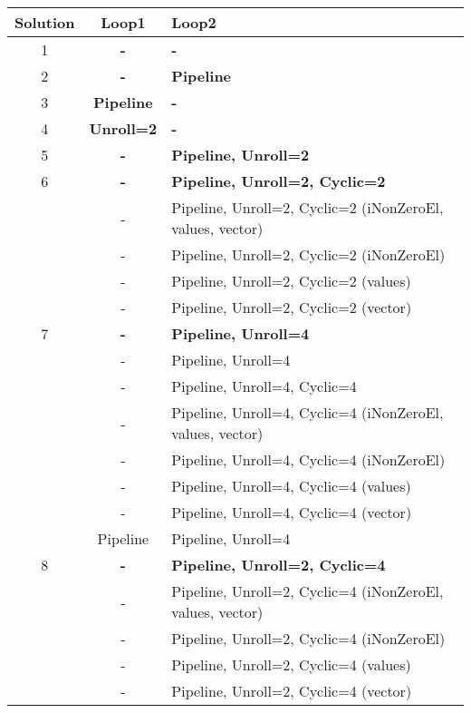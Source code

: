 \begin{table}[H]
	\centering
	\begin{tabular}{|c|c|l|}
		\hline
		\textbf{Solution} & Loop1 & Loop2 \\
		\hline
		
		1 & \textbf{-} & \textbf{-} \\
		\hline
		
		2 & \textbf{-} & \textbf{Pipeline} \\
		\hline
		
		3 & \textbf{Pipeline} & \textbf{-} \\
		\hline
		
		4 & \textbf{Unroll=2} & \textbf{-} \\
		\hline
		
		5 & \textbf{-} & \textbf{Pipeline, Unroll=2} \\
		\hline
		
		 6 & \textbf{-} & \textbf{Pipeline, Unroll=2, Cyclic=2} \\
		 & - & \tabitem\footnotesize{Pipeline, Unroll=2, Cyclic=2 (iNonZeroEl, values, vector)} \\
		 & - & \tabitem\footnotesize{Pipeline, Unroll=2, Cyclic=2 (iNonZeroEl)} \\
		 & - & \tabitem\footnotesize{Pipeline, Unroll=2, Cyclic=2 (values)} \\
		 & - & \tabitem\footnotesize{Pipeline, Unroll=2, Cyclic=2 (vector)} \\
		\hline
		
		7 & \textbf{-} & \textbf{Pipeline, Unroll=4} \\
		& \footnotesize{-} & \footnotesize{Pipeline, Unroll=4} \\
		& \footnotesize{-} & \footnotesize{Pipeline, Unroll=4, Cyclic=4} \\
		& \scriptsize{-} & \tabitem\scriptsize{Pipeline, Unroll=4, Cyclic=4 (iNonZeroEl, values, vector)} \\
		& \scriptsize{-} & \tabitem\scriptsize{Pipeline, Unroll=4, Cyclic=4 (iNonZeroEl)} \\
		& \scriptsize{-} & \tabitem\scriptsize{Pipeline, Unroll=4, Cyclic=4 (values)} \\
		& \scriptsize{-} & \tabitem\scriptsize{Pipeline, Unroll=4, Cyclic=4 (vector)} \\
		& \footnotesize{Pipeline} & \footnotesize{Pipeline, Unroll=4} \\
		\hline
		
		8 & \textbf{-} & \textbf{Pipeline, Unroll=2, Cyclic=4} \\
		& \scriptsize{-} & \tabitem\footnotesize{Pipeline, Unroll=2, Cyclic=4 (iNonZeroEl, values, vector)} \\
		& \scriptsize{-} & \tabitem\footnotesize{Pipeline, Unroll=2, Cyclic=4 (iNonZeroEl)} \\
		& \scriptsize{-} & \tabitem\footnotesize{Pipeline, Unroll=2, Cyclic=4 (values)} \\
		& \scriptsize{-} & \tabitem\footnotesize{Pipeline, Unroll=2, Cyclic=4 (vector)} \\
		\hline
		

\end{tabular}
\end{table}
